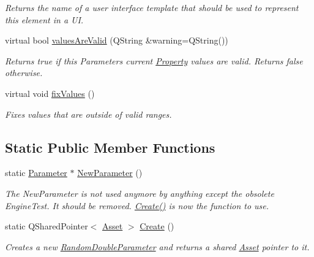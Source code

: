 \begin{DoxyCompactItemize}
\begin{DoxyCompactList}\small\item\em Returns the name of a user interface template that should be used to represent this element in a U\-I. \end{DoxyCompactList}\item 
virtual bool \hyperlink{class_picto_1_1_random_double_parameter_abb2d8471e55229456f4be1da03206c45}{values\-Are\-Valid} (Q\-String \&warning=Q\-String())
\begin{DoxyCompactList}\small\item\em Returns true if this Parameters current \hyperlink{class_picto_1_1_property}{Property} values are valid. Returns false otherwise. \end{DoxyCompactList}\item 
virtual void \hyperlink{class_picto_1_1_random_double_parameter_a509f6f2a0d306efbc14e709a5ad902c0}{fix\-Values} ()
\begin{DoxyCompactList}\small\item\em Fixes values that are outside of valid ranges. \end{DoxyCompactList}\end{DoxyCompactItemize}
\subsection*{Static Public Member Functions}
\begin{DoxyCompactItemize}
\item 
\hypertarget{class_picto_1_1_random_double_parameter_a76425902f66a6be70f3d125c9b6d18c3}{static \hyperlink{class_picto_1_1_parameter}{Parameter} $\ast$ \hyperlink{class_picto_1_1_random_double_parameter_a76425902f66a6be70f3d125c9b6d18c3}{New\-Parameter} ()}\label{class_picto_1_1_random_double_parameter_a76425902f66a6be70f3d125c9b6d18c3}

\begin{DoxyCompactList}\small\item\em The New\-Parameter is not used anymore by anything except the obsolete Engine\-Test. It should be removed. \hyperlink{class_picto_1_1_random_double_parameter_a172c5a974da19d51ffd17f88963073b2}{Create()} is now the function to use. \end{DoxyCompactList}\item 
\hypertarget{class_picto_1_1_random_double_parameter_a172c5a974da19d51ffd17f88963073b2}{static Q\-Shared\-Pointer$<$ \hyperlink{class_picto_1_1_asset}{Asset} $>$ \hyperlink{class_picto_1_1_random_double_parameter_a172c5a974da19d51ffd17f88963073b2}{Create} ()}\label{class_picto_1_1_random_double_parameter_a172c5a974da19d51ffd17f88963073b2}

\begin{DoxyCompactList}\small\item\em Creates a new \hyperlink{class_picto_1_1_random_double_parameter}{Random\-Double\-Parameter} and returns a shared \hyperlink{class_picto_1_1_asset}{Asset} pointer to it. \end{DoxyCompactList}\end{DoxyCompactItemize}
